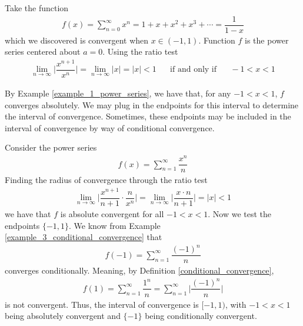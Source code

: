\begin{example}
Take the function
\begin{align*}
    f(x) = \sum_{n=0}^{\infty} x^{n} = 1 + x + x^{2} + x^{3} + \cdots = \dfrac{1}{1-x}
\end{align*}
which we discovered is convergent when $x \in (-1, 1)$. Function $f$ is the power series centered about $a=0$. Using the ratio test
\begin{align*}
    \lim_{n \longrightarrow \infty} \Big\lvert \dfrac{x^{n+1}}{x^{n}} \Big\rvert = \lim_{n \longrightarrow \infty} \lvert x \rvert = \lvert x \rvert < 1 \hspace{20pt} \text{if and only if} \hspace{20pt} -1 < x < 1
\end{align*}
\label{example_1_power_series}
\end{example}

By Example \ref{example_1_power_series}, we have that, for any $-1 < x < 1$, $f$ converges absolutely. We may plug in the endpoints for this interval to determine the interval of convergence. Sometimes, these endpoints may be included in the interval of convergence by way of conditional convergence.

\begin{example}
Consider the power series
\begin{align*}
    f(x) = \sum_{n = 1}^{\infty} \dfrac{x^{n}}{n}
\end{align*}
Finding the radius of convergence through the ratio test
\begin{align*}
    \lim_{n \longrightarrow \infty}\Big\lvert \dfrac{x^{n+1}}{n+1} \cdot \dfrac{n}{x^{n}} \Big\rvert = \lim_{n \longrightarrow \infty} \Big\lvert \dfrac{x \cdot n}{n+1} \Big\rvert = \lvert x \rvert < 1
\end{align*}
we have that $f$ is absolute convergent for all $-1 < x < 1$. Now we test the endpoints $\{-1, 1\}$. We know from Example \ref{example_3_conditional_convergence} that
\begin{align*}
    f(-1) = \sum_{n = 1}^{\infty} \dfrac{(-1)^{n}}{n}
\end{align*} 
converges conditionally. Meaning, by Definition \ref{conditional_convergence}, 
\begin{align*}
    f(1) = \sum_{n = 1}^{\infty} \dfrac{1^{n}}{n} = \sum_{n = 1}^{\infty} \Big\lvert \dfrac{(-1)^{n}}{n} \Big\rvert
\end{align*}
is not convergent. Thus, the interval of convergence is $[-1 , 1)$, with $-1 < x < 1$ being absolutely convergent and $\{-1\}$ being conditionally convergent. 
\end{example}

